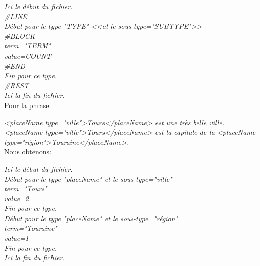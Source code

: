 \bigskip
\noindent \emph{Ici le début du fichier.}\\
\emph{\#LINE}\\
\hspace*{1cm} \emph{Début pour le type "{TYPE}" <<et le sous-type="{SUBTYPE}">>}\\
\emph{\#BLOCK}\\
\hspace*{1cm} \emph{term="{TERM}"}\\
\hspace*{1cm} \emph{value={COUNT}}\\
\emph{\#END}\\
\hspace*{1cm} \emph{Fin pour ce type.}\\
\emph{\#REST}\\
\emph{Ici la fin du fichier.}\\


\noindent Pour la phrase:

\bigskip
\noindent \emph{<placeName type="ville">Tours</placeName> est une très belle ville. <placeName type="ville">Tours</placeName> est la capitale de la <placeName type="région">Touraine</placeName>.}\\

Nous obtenons:

\bigskip
\noindent \emph{Ici le début du fichier.}\\
\hspace*{1cm} \emph{Début pour le type "placeName" et le sous-type="ville"} \\
\hspace*{1cm} \hspace*{1cm} \emph{term="Tours"} \\
\hspace*{1cm} \hspace*{1cm} \emph{value=2} \\
\hspace*{1cm} \emph{Fin pour ce type.}\\
\hspace*{1cm} \emph{Début pour le type "placeName" et le sous-type="région"} \\
\hspace*{1cm} \hspace*{1cm} \emph{term="Touraine"} \\
\hspace*{1cm} \hspace*{1cm} \emph{value=1} \\
\hspace*{1cm} \emph{Fin pour ce type.}\\
\emph{Ici la fin du fichier.}\\

